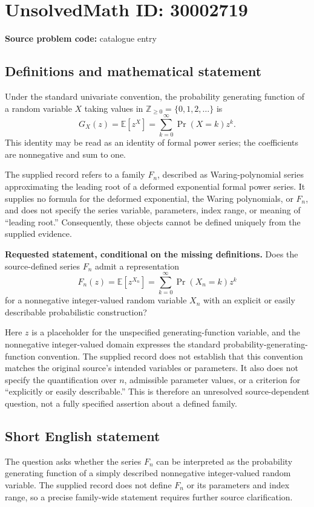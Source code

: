 \documentclass[11pt]{article}
\newcommand{\Z}{\mathbb{Z}}
\newcommand{\E}{\mathbb{E}}
\begin{document}
\section*{UnsolvedMath ID: 30002719}
\textbf{Source problem code:} catalogue entry
\subsection{Definitions and mathematical statement}
Under the standard univariate convention, the probability generating function of a random variable \(X\) taking values in \(\Z_{\geq 0}=\{0,1,2,\ldots\}\) is
\[
G_X(z)=\E[z^X]=\sum_{k=0}^{\infty}\Pr(X=k)z^k.
\]
This identity may be read as an identity of formal power series; the coefficients are nonnegative and sum to one.

The supplied record refers to a family \(F_n\), described as Waring-polynomial series approximating the leading root of a deformed exponential formal power series. It supplies no formula for the deformed exponential, the Waring polynomials, or \(F_n\), and does not specify the series variable, parameters, index range, or meaning of ``leading root.'' Consequently, these objects cannot be defined uniquely from the supplied evidence.

\textbf{Requested statement, conditional on the missing definitions.} Does the source-defined series \(F_n\) admit a representation
\[
F_n(z)=\E[z^{X_n}]
      =\sum_{k=0}^{\infty}\Pr(X_n=k)z^k
\]
for a nonnegative integer-valued random variable \(X_n\) with an explicit or easily describable probabilistic construction?

Here \(z\) is a placeholder for the unspecified generating-function variable, and the nonnegative integer-valued domain expresses the standard probability-generating-function convention. The supplied record does not establish that this convention matches the original source's intended variables or parameters. It also does not specify the quantification over \(n\), admissible parameter values, or a criterion for ``explicitly or easily describable.'' This is therefore an unresolved source-dependent question, not a fully specified assertion about a defined family.
\subsection{Short English statement}
The question asks whether the series \(F_n\) can be interpreted as the probability generating function of a simply described nonnegative integer-valued random variable. The supplied record does not define \(F_n\) or its parameters and index range, so a precise family-wide statement requires further source clarification.
\end{document}
